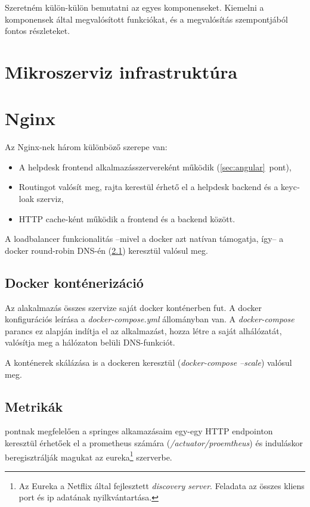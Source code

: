 Szeretném külön-külön bemutatni az egyes komponenseket. Kiemelni a komponensek által megvalósított funkciókat, és a megvalósítás szempontjából fontos részleteket. 

\section{Mikroszerviz infrastruktúra}

\section{Nginx}\label{sec:nginx}
Az Nginx-nek három különböző szerepe van:

\begin{itemize}
	\item A \foreignlanguage{british}{helpdesk frontend} alkalmazásszervereként működik (\ref{sec:angular}~pont),
	
	\item \foreignlanguage{british}{Routing}ot valósít meg, rajta kerestül érhető el a \foreignlanguage{british}{helpdesk backend} és a \foreignlanguage{british}{keycloak} szerviz,
	
	\item \foreignlanguage{british}{HTTP cache}-ként működik a frontend és a backend között.
\end{itemize}

A loadbalancer funkcionalitás --mivel a docker azt natívan támogatja, így-- a \foreignlanguage{british}{docker round-robin DNS}-én (\ref{sec:docker}) keresztül valósul meg.


\subsection{Docker konténerizáció}\label{sec:docker}
Az alakalmazás összes szervize saját docker konténerben fut. A docker konfigurációs leírása a \textit{docker-compose.yml} állományban van. A \textit{docker-compose} parancs ez alapján indítja el az alkalmazást, hozza létre a saját alhálózatát, valósítja meg a hálózaton belüli DNS-funkciót.

A konténerek skálázása  is a dockeren keresztül (\textit{docker-compose --scale}) valósul meg.


\subsection{Metrikák}\label{sec:metrikak}
 pontnak megfelelően a springes alkamazásaim egy-egy HTTP endpointon keresztül érhetőek el a prometheus számára (\textit{\mbox{/actuator/proemtheus}}) és induláskor beregisztrálják magukat az eureka\footnote{Az Eureka a Netflix által fejlesztett \textit{discovery server}. Feladata az összes kliens port és ip adatának nyilkvántartása.} szerverbe.


